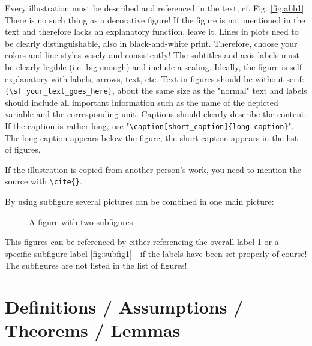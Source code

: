 Every illustration must be described and referenced in the text, cf. Fig. \ref{fig:abb1}. 
There is no such thing as a decorative figure! 
If the figure is not mentioned in the text and therefore lacks an explanatory function, leave it.
Lines in plots need to be clearly distinguishable, also in black-and-white print. Therefore, choose your colors and line styles wisely and consistently!
The subtitles and axis labels must be clearly legible (i.e. big enough) and include a scaling. Ideally, the figure is self-explanatory with labels, arrows, text, etc. Text in figures should be without serif: \verb|{\sf your_text_goes_here}|, about the same size as the "normal" text and labels should include all important information such as the name of the depicted variable and the corresponding unit. Captions should clearly describe the content. If the caption is rather long, use "\verb|\caption[short_caption]{long caption}|". The long caption appears below the figure, the short caption appears in the list of figures. 

If the illustration is copied from another person's work, you need to mention the
source with \verb|\cite{}|.

By using subfigure several pictures can be combined in one main picture:

\begin{figure}[htb]
\centering
{}
\quad %

\caption[Abbrev. Descr. of subfigure-figure]{A figure with two subfigures}
\label{fig:OverallPic}
\end{figure}

This figures can be referenced by either referencing the overall label \ref{fig:OverallPic} or a specific subfigure label \ref{fig:subfig1} - if the labels have been set properly of course! The subfigures are not listed in the list of figures!

\section{Definitions / Assumptions / Theorems / Lemmas}

